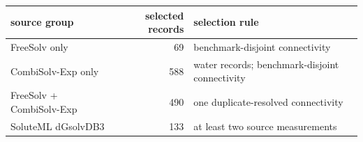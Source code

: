 \begin{tabular}{lrl}
\toprule
source group & selected records & selection rule \\
\midrule
FreeSolv only & 69 & benchmark-disjoint connectivity \\
CombiSolv-Exp only & 588 & water records; benchmark-disjoint connectivity \\
FreeSolv + CombiSolv-Exp & 490 & one duplicate-resolved connectivity \\
SoluteML dGsolvDB3 & 133 & at least two source measurements \\
\bottomrule
\end{tabular}
